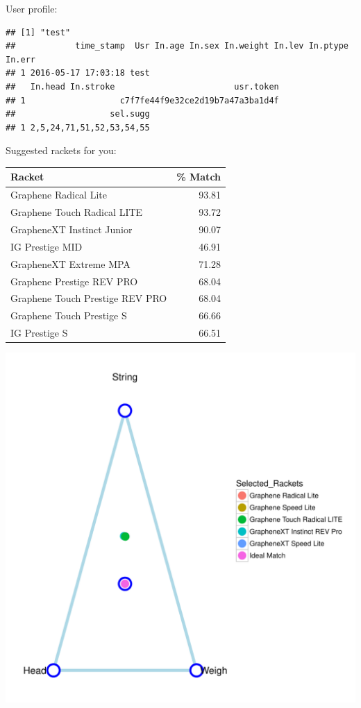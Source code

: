 \documentclass{article}\usepackage[]{graphicx}\usepackage[]{color}
\makeatletter
\def\maxwidth{ %
  \ifdim\Gin@nat@width>\linewidth
    \linewidth
  \else
    \Gin@nat@width
  \fi
}
\newenvironment{kframe}{%
 \def\at@end@of@kframe{}%
 \ifinner\ifhmode%
  \def\at@end@of@kframe{\end{minipage}}%
  \begin{minipage}{\columnwidth}%
 \fi\fi%
 \def\FrameCommand##1{\hskip\@totalleftmargin \hskip-\fboxsep
 \colorbox{shadecolor}{##1}\hskip-\fboxsep
     \hskip-\linewidth \hskip-\@totalleftmargin \hskip\columnwidth}%
 \MakeFramed {\advance\hsize-\width
   \@totalleftmargin\z@ \linewidth\hsize
   \@setminipage}}%
 {\par\unskip\endMakeFramed%
 \at@end@of@kframe}
\newenvironment{knitrout}{}{} %
\makeatother
\begin{document}
User profile:

\begin{knitrout}
\color{fgcolor}\begin{kframe}
\begin{verbatim}
## [1] "test"
##            time_stamp  Usr In.age In.sex In.weight In.lev In.ptype In.err
## 1 2016-05-17 17:03:18 test                                               
##   In.head In.stroke                        usr.token
## 1                   c7f7fe44f9e32ce2d19b7a47a3ba1d4f
##                   sel.sugg
## 1 2,5,24,71,51,52,53,54,55
\end{verbatim}
\end{kframe}
\end{knitrout}


Suggested rackets for you:

\begin{tabular}{lr}
  \hline
Racket & \% Match \\ 
  \hline
Graphene Radical Lite & 93.81 \\ 
  Graphene Touch Radical LITE & 93.72 \\ 
  GrapheneXT Instinct Junior & 90.07 \\ 
  IG Prestige MID & 46.91 \\ 
  GrapheneXT Extreme MPA & 71.28 \\ 
  Graphene Prestige REV PRO & 68.04 \\ 
  Graphene Touch Prestige REV PRO & 68.04 \\ 
  Graphene Touch Prestige S & 66.66 \\ 
  IG Prestige S & 66.51 \\ 
   \hline
\end{tabular}


\begin{knitrout}
\color{fgcolor}
\includegraphics[width=\maxwidth]{figure/res2-1} 

\end{knitrout}
\end{document}
